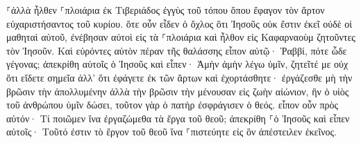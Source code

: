 \documentclass{openreader}
\begin{document}
⸀ἀλλὰ ἦλθεν ⸀πλοιάρια ἐκ Τιβεριάδος ἐγγὺς τοῦ τόπου ὅπου ἔφαγον τὸν ἄρτον εὐχαριστήσαντος τοῦ κυρίου. 
ὅτε οὖν εἶδεν ὁ ὄχλος ὅτι Ἰησοῦς οὐκ ἔστιν ἐκεῖ οὐδὲ οἱ μαθηταὶ αὐτοῦ, ἐνέβησαν αὐτοὶ εἰς τὰ ⸀πλοιάρια καὶ ἦλθον εἰς Καφαρναοὺμ ζητοῦντες τὸν Ἰησοῦν. 
Καὶ εὑρόντες αὐτὸν πέραν τῆς θαλάσσης εἶπον αὐτῷ· Ῥαββί, πότε ὧδε γέγονας; 
ἀπεκρίθη αὐτοῖς ὁ Ἰησοῦς καὶ εἶπεν· Ἀμὴν ἀμὴν λέγω ὑμῖν, ζητεῖτέ με οὐχ ὅτι εἴδετε σημεῖα ἀλλ’ ὅτι ἐφάγετε ἐκ τῶν ἄρτων καὶ ἐχορτάσθητε· 
ἐργάζεσθε μὴ τὴν βρῶσιν τὴν ἀπολλυμένην ἀλλὰ τὴν βρῶσιν τὴν μένουσαν εἰς ζωὴν αἰώνιον, ἣν ὁ υἱὸς τοῦ ἀνθρώπου ὑμῖν δώσει, τοῦτον γὰρ ὁ πατὴρ ἐσφράγισεν ὁ θεός. 
εἶπον οὖν πρὸς αὐτόν· Τί ποιῶμεν ἵνα ἐργαζώμεθα τὰ ἔργα τοῦ θεοῦ; 
ἀπεκρίθη ⸀ὁ Ἰησοῦς καὶ εἶπεν αὐτοῖς· Τοῦτό ἐστιν τὸ ἔργον τοῦ θεοῦ ἵνα ⸀πιστεύητε εἰς ὃν ἀπέστειλεν ἐκεῖνος. 
\end{document}
